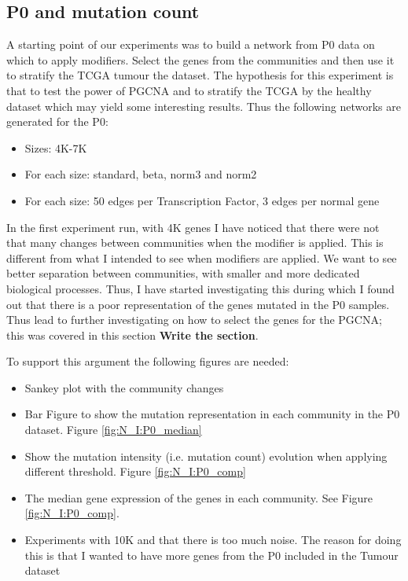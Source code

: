\subsection{P0 and mutation count}

A starting point of our experiments was to build a network from P0 data on which to apply modifiers. Select the genes from the communities and then use it to stratify the TCGA tumour the dataset. The hypothesis for this experiment is that to test the power of PGCNA and to stratify the TCGA by the healthy dataset which may yield some interesting results. Thus the following networks are generated for the P0:

\begin{itemize}
    \item Sizes: 4K-7K
    \item For each size: standard, beta, norm3 and norm2
    \item For each size: 50 edges per Transcription Factor, 3 edges per normal gene
\end{itemize}


In the first experiment run, with 4K genes I have noticed that there were not that many changes between communities when the modifier is applied. This is different from what I intended to see when modifiers are applied. We want to see better separation between communities, with smaller and more dedicated biological processes. Thus, I have started investigating this during which I found out that there is a poor representation of the genes mutated in the P0 samples. Thus lead to further investigating on how to select the genes for the PGCNA; this was covered in this section \textbf{Write the section}.

To support this argument the following figures are needed:
\begin{itemize}
    \item Sankey plot with the community changes 
    \item Bar Figure to show the mutation representation in each community in the P0 dataset. Figure \ref{fig:N_I:P0_median}
    \item Show the mutation intensity (i.e. mutation count) evolution when applying different threshold.  Figure \ref{fig:N_I:P0_comp}
    \item The median gene expression of the genes in each community. See Figure \ref{fig:N_I:P0_comp}.
    \item Experiments with 10K and that there is too much noise. The reason for doing this is that I wanted to have more genes from the P0 included in the Tumour dataset
\end{itemize}

